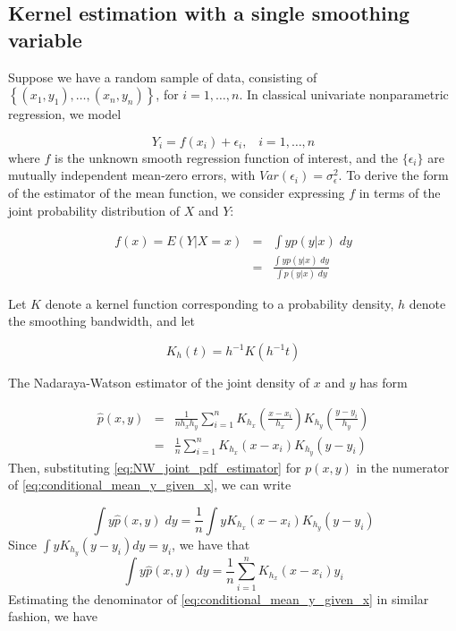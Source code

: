 \documentclass[12pt]{article}
\begin{document}
\subsection{Kernel estimation with a single smoothing variable}

Suppose we have a random sample of data, consisting of $\left\{ \left(x_1, y_1\right),\dots, \left(x_n, y_n\right)\right\}$, for $i=1,\dots,n$. In classical univariate nonparametric regression, we model 

\begin{equation}
Y_i = f\left(x_i\right) + \epsilon_i,\;\;\;i=1,\dots, n \label{eq:classical_NP_regression_model}
\end{equation} 
\noindent
where $f$ is the unknown smooth regression function of interest, and the $\lbrace \epsilon_i \rbrace$ are mutually independent mean-zero errors, with $Var\left(\epsilon_i\right)=\sigma_\epsilon^2$. To derive the form of the estimator of the mean function, we consider expressing $f$ in terms of the joint probability distribution of $X$ and $Y$:

\begin{eqnarray} 
f\left(x\right) = E\left(Y \vert X=x\right) &=& \int yp(y \vert x)\;dy \nonumber \\
&=& \frac{ \int yp(y \vert x)\;dy }{ \int p(y \vert x)\;dy } \label{eq:conditional_mean_y_given_x}
\end{eqnarray}
 
Let $K$ denote a kernel function corresponding to a probability density, $h$ denote the smoothing bandwidth, and let 

\[
K_h\left(t\right) = h^{-1} K\left(h^{-1} t \right)
\] 

The Nadaraya-Watson estimator of the joint density of $x$ and $y$ has form

\begin{eqnarray} 
\hat{p}\left(x,y\right) &=& \frac{1}{nh_x h_y}\sum_{i=1}^{n} K_{h_x}\left(\frac{x-x_i}{h_x}\right) K_{h_y}\left(\frac{y-y_i}{h_y}\right)  \nonumber \\ 
&=& \frac{1}{n}\sum_{i=1}^{n} K_{h_x}\left(x-x_i\right) K_{h_y}\left(y-y_i\right) \label{eq:NW_joint_pdf_estimator} 
\end{eqnarray}
\noindent
Then, substituting \ref{eq:NW_joint_pdf_estimator} for $p\left(x,y\right)$ in the numerator of \ref{eq:conditional_mean_y_given_x}, we can write 

\begin{equation} \nonumber 
\int y \hat{p}\left(x,y\right)\;dy = \frac{1}{n} \int y K_{h_x}\left(x-x_i\right) K_{h_y}\left(y-y_i\right)
\end{equation} 
\noindent
Since $\int yK_{h_y}\left(y-y_i\right)dy = y_i$, we have that 
\begin{equation} \label{eq:num_est}
\int y \hat{p}\left(x,y\right)\;dy = \frac{1}{n}\sum_{i=1}^n K_{h_x}\left(x-x_i\right) y_i 
\end{equation} 
\noindent
Estimating the denominator of \ref{eq:conditional_mean_y_given_x} in similar fashion, we have 
\end{document}

